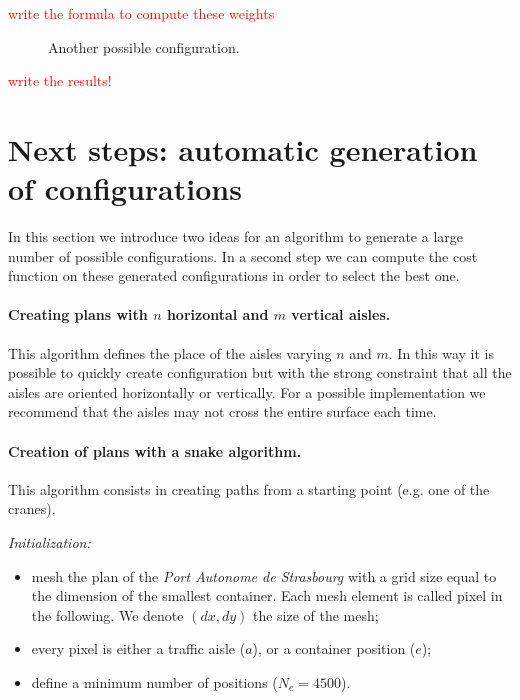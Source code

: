 \documentclass{article}
\newcommand{\ls}[1]{\textcolor{red}{#1}}
\newcommand{\PAS}{\emph{Port Autonome de Strasbourg }}
\begin{document}
 \ls{write the formula to compute these weights}


\begin{figure}[!htb]
\centering

\caption{Another possible configuration.}
\label{fig:2D_PAS_actuel} 
\end{figure}

\ls{write the results!}

\section{Next steps: automatic generation of configurations} 

In this section we introduce two ideas for an algorithm to generate a large number of possible configurations.
In a second step we can compute the cost function on these generated configurations in order to select the best one.

\paragraph{Creating plans with $ n $ horizontal and $ m $ vertical aisles.} 
This algorithm defines the place of the aisles varying $ n $ and $ m $. 
In this way it is possible to quickly create configuration but with the strong constraint that all the aisles are oriented horizontally or vertically. 
For a possible implementation we recommend that the aisles may not cross the entire surface each time.

\paragraph{Creation of plans with a snake algorithm.}
This algorithm consists in creating paths from a starting point (e.g. one of the cranes). %

\noindent
\textit{Initialization:}
\begin{itemize}
	\item mesh the plan of the \PAS with a grid size equal to the dimension of the smallest container. Each mesh element is called pixel in the following. We denote $ (dx, dy) $ the size of the mesh;
	\item every pixel is either a traffic aisle ($ a $), or a container position ($ e $);
	\item define a minimum number of positions ($N_e=4500$). 
\end{itemize}
\end{document}
